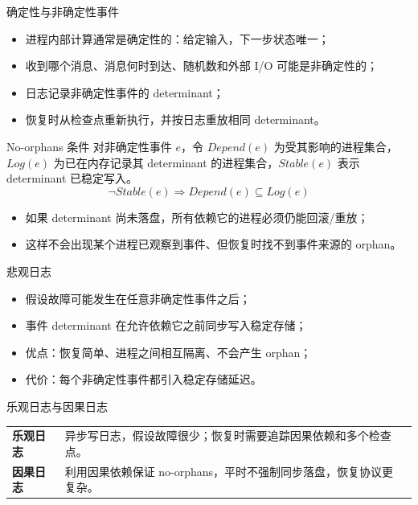 \documentclass[UTF8,fontset=none,aspectratio=169,10pt]{beamer}
\begin{document}
\begin{frame}{确定性与非确定性事件}
\begin{itemize}
  \item 进程内部计算通常是确定性的：给定输入，下一步状态唯一；
  \item 收到哪个消息、消息何时到达、随机数和外部 I/O 可能是非确定性的；
  \item 日志记录非确定性事件的 determinant；
  \item 恢复时从检查点重新执行，并按日志重放相同 determinant。
\end{itemize}
\end{frame}

\begin{frame}{No-orphans 条件}
对非确定性事件 $e$，令 $Depend(e)$ 为受其影响的进程集合，$Log(e)$ 为已在内存记录其 determinant 的进程集合，$Stable(e)$ 表示 determinant 已稳定写入。
\[
\neg Stable(e)\Rightarrow Depend(e)\subseteq Log(e)
\]
\begin{itemize}
  \item 如果 determinant 尚未落盘，所有依赖它的进程必须仍能回滚/重放；
  \item 这样不会出现某个进程已观察到事件、但恢复时找不到事件来源的 orphan。
\end{itemize}
\end{frame}

\begin{frame}{悲观日志}
\begin{itemize}
  \item 假设故障可能发生在任意非确定性事件之后；
  \item 事件 determinant 在允许依赖它之前同步写入稳定存储；
  \item 优点：恢复简单、进程之间相互隔离、不会产生 orphan；
  \item 代价：每个非确定性事件都引入稳定存储延迟。
\end{itemize}
\end{frame}

\begin{frame}{乐观日志与因果日志}
\begin{tabularx}{\linewidth}{>{\bfseries}p{2.8cm}XX}
\toprule
乐观日志 & 异步写日志，假设故障很少；恢复时需要追踪因果依赖和多个检查点。 \\
因果日志 & 利用因果依赖保证 no-orphans，平时不强制同步落盘，恢复协议更复杂。 \\
\bottomrule
\end{tabularx}
\vfill
{}
\end{frame}
\end{document}
